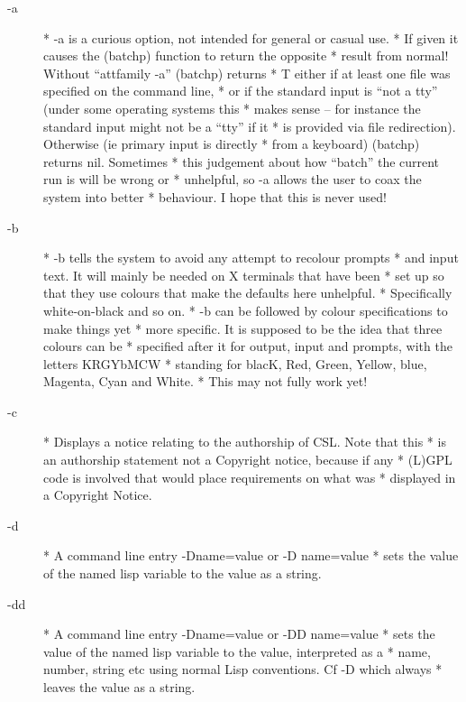 \documentclass[a4paper,11pt]{article}
\begin{document}
\begin{description}
\item [{\ttfamily -a}] 
          * {\ttfamily -a} is a curious option, not intended for general or casual use.
          * If given it causes the {\ttfamily (batchp)} function to return the opposite
          * result from normal!  Without ``{attfamily -a}'' {\ttfamily (batchp)} returns
          * {\ttfamily T} either if at least one file was specified on the command line,
          * or if the standard input is ``not a tty'' (under some operating systems this
          * makes sense -- for instance the standard input might not be a ``tty'' if it
          * is provided via file redirection).  Otherwise (ie primary input is directly
          * from a keyboard) {\ttfamily (batchp)} returns {\ttfamily nil}.  Sometimes
          * this judgement about how ``batch'' the current run is will be wrong or
          * unhelpful, so {\ttfamily -a} allows the user to coax the system into better
          * behaviour.  I hope that this is never used!

\item [{\ttfamily -b}] 
          * {\ttfamily -b} tells the system to avoid any attempt to recolour prompts
          * and input text. It will mainly be needed on X terminals that have been
          * set up so that they use colours that make the defaults here unhelpful.
          * Specifically white-on-black and so on.
          * {\ttfamily -b} can be followed by colour specifications to make things yet
          * more specific. It is supposed to be the idea that three colours can be
          * specified after it for output, input and prompts, with the letters KRGYbMCW
          * standing for blacK, Red, Green, Yellow, blue, Magenta, Cyan and White.
          * This may not fully work yet!

\item [{\ttfamily -c}] 
          * Displays a notice relating to the authorship of CSL. Note that this
          * is an authorship statement not a Copyright notice, because if any
          * (L)GPL code is involved that would place requirements on what was
          * displayed in a Copyright Notice.

\item [{\ttfamily -d}] 
          * A command line entry {\ttfamily -Dname=value} or {\ttfamily -D name=value}
          * sets the value of the named lisp variable to the value as a string.

\item [{\ttfamily -dd}] 
          * A command line entry {\ttfamily -Dname=value} or {\ttfamily -DD name=value}
          * sets the value of the named lisp variable to the value, interpreted as a
          * name, number, string etc using normal Lisp conventions. Cf -D which always
          * leaves the value as a string.


\end{description}
\end{document}
